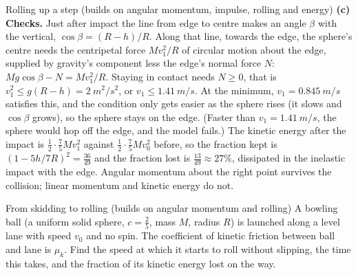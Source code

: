 \begin{challengebox}{Rolling up a step (builds on angular momentum, impulse, rolling and energy)}
{\textbf{(c) Checks.} Just after impact the line from edge to centre makes an angle $\beta$ with the vertical,
$\cos\beta=(R-h)/R$. Along that line, towards the edge, the sphere's centre needs the centripetal force
$Mv_1^2/R$ of circular motion about the edge, supplied by gravity's component less the edge's normal force
$N$: $Mg\cos\beta-N=Mv_1^2/R$. Staying in contact needs $N\ge0$, that is
$v_1^2\le g(R-h)=\SI{2}{m^2/s^2}$, or $v_1\le\SI{1.41}{m/s}$. At the minimum, $v_1=\SI{0.845}{m/s}$ satisfies
this, and the condition only gets easier as the sphere rises (it slows and $\cos\beta$ grows), so the
sphere stays on the edge. (Faster than $v_1=\SI{1.41}{m/s}$, the sphere would hop off the edge, and the model
fails.) The kinetic energy after the impact is $\tfrac12\cdot\tfrac75Mv_1^2$ against $\tfrac12\cdot\tfrac75Mv_0^2$
before, so the fraction kept is $(1-5h/7R)^2=\tfrac{36}{49}$ and the fraction lost is
$\tfrac{13}{49}\approx27\%$, dissipated in the inelastic impact with the edge. Angular momentum about the
right point survives the collision; linear momentum and kinetic energy do not.}
\end{challengebox}

\begin{challengebox}{From skidding to rolling (builds on angular momentum and rolling)}\label{ex:skid15}
A bowling ball (a uniform solid sphere, $c=\tfrac25$, mass $M$, radius $R$) is launched along a level lane
with speed $v_0$ and no spin. The coefficient of kinetic friction between ball and lane is $\mu_k$. Find the
speed at which it starts to roll without slipping, the time this takes, and the fraction of its kinetic
energy lost on the way.
\end{challengebox}

